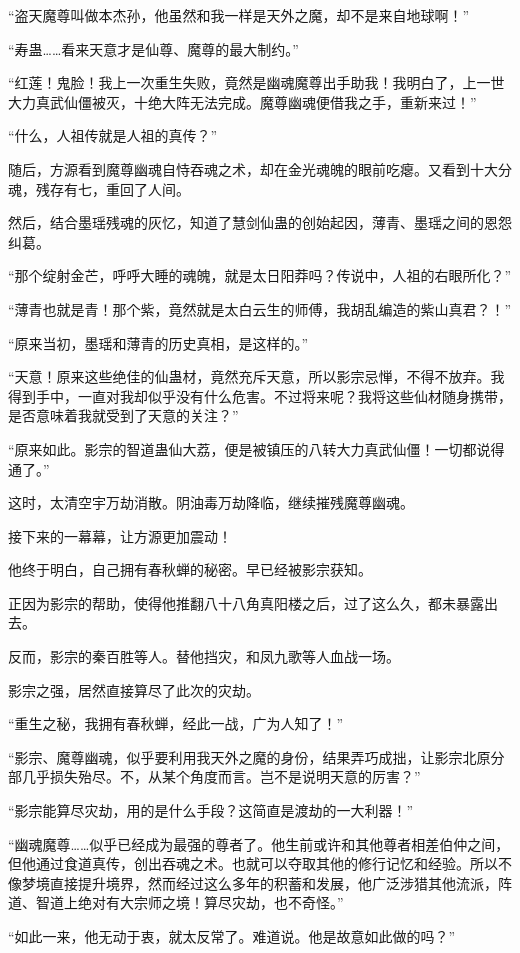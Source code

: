 \begin{this_body}
“盗天魔尊叫做本杰孙，他虽然和我一样是天外之魔，却不是来自地球啊！”

“寿蛊……看来天意才是仙尊、魔尊的最大制约。”

“红莲！鬼脸！我上一次重生失败，竟然是幽魂魔尊出手助我！我明白了，上一世大力真武仙僵被灭，十绝大阵无法完成。魔尊幽魂便借我之手，重新来过！”

“什么，人祖传就是人祖的真传？”

随后，方源看到魔尊幽魂自恃吞魂之术，却在金光魂魄的眼前吃瘪。又看到十大分魂，残存有七，重回了人间。

然后，结合墨瑶残魂的灰忆，知道了慧剑仙蛊的创始起因，薄青、墨瑶之间的恩怨纠葛。

“那个绽射金芒，呼呼大睡的魂魄，就是太日阳莽吗？传说中，人祖的右眼所化？”

“薄青也就是青！那个紫，竟然就是太白云生的师傅，我胡乱编造的紫山真君？！”

“原来当初，墨瑶和薄青的历史真相，是这样的。”

“天意！原来这些绝佳的仙蛊材，竟然充斥天意，所以影宗忌惮，不得不放弃。我得到手中，一直对我却似乎没有什么危害。不过将来呢？我将这些仙材随身携带，是否意味着我就受到了天意的关注？”

“原来如此。影宗的智道蛊仙大荔，便是被镇压的八转大力真武仙僵！一切都说得通了。”

这时，太清空宇万劫消散。阴油毒万劫降临，继续摧残魔尊幽魂。

接下来的一幕幕，让方源更加震动！

他终于明白，自己拥有春秋蝉的秘密。早已经被影宗获知。

正因为影宗的帮助，使得他推翻八十八角真阳楼之后，过了这么久，都未暴露出去。

反而，影宗的秦百胜等人。替他挡灾，和凤九歌等人血战一场。

影宗之强，居然直接算尽了此次的灾劫。

“重生之秘，我拥有春秋蝉，经此一战，广为人知了！”

“影宗、魔尊幽魂，似乎要利用我天外之魔的身份，结果弄巧成拙，让影宗北原分部几乎损失殆尽。不，从某个角度而言。岂不是说明天意的厉害？”

“影宗能算尽灾劫，用的是什么手段？这简直是渡劫的一大利器！”

“幽魂魔尊……似乎已经成为最强的尊者了。他生前或许和其他尊者相差伯仲之间，但他通过食道真传，创出吞魂之术。也就可以夺取其他的修行记忆和经验。所以不像梦境直接提升境界，然而经过这么多年的积蓄和发展，他广泛涉猎其他流派，阵道、智道上绝对有大宗师之境！算尽灾劫，也不奇怪。”

“如此一来，他无动于衷，就太反常了。难道说。他是故意如此做的吗？”


\end{this_body}
